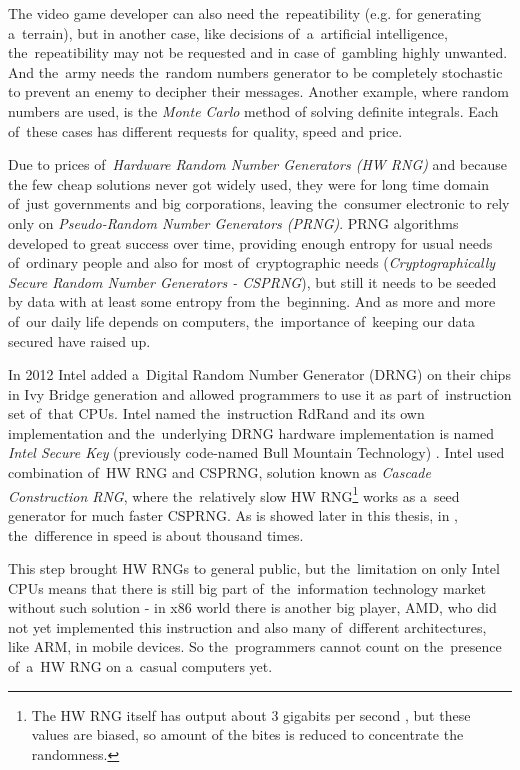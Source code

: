 \par{
The video game developer can also need the~repeatibility (e.g. for generating 
a~terrain), but in another case, like decisions of~a~artificial intelligence, 
the~repeatibility may not be requested and in case of~gambling highly unwanted. 
And the~army needs the~random numbers generator to be completely stochastic 
to prevent an enemy to decipher their messages. Another example, where random 
numbers are used, is the {\em Monte Carlo} method of solving definite integrals. 
Each of~these cases has different requests for quality, speed and price.
}

\par{
Due to prices of~{\em Hardware Random Number Generators (HW RNG)} 
and because the few cheap solutions never got widely used, 
they were for long time domain of~just governments and big corporations,
leaving the~consumer electronic to rely only on {\em Pseudo-Random Number 
Generators (PRNG)}. PRNG algorithms developed to great success over time, 
providing enough entropy for usual needs of~ordinary people and also for most 
of~cryptographic needs ({\em Cryptographically Secure Random Number 
Generators - CSPRNG}), but still it needs to be seeded by data with at least 
some entropy from the~beginning. And as more and more of~our daily life 
depends on computers, the~importance of~keeping our data secured have 
raised up. 
}

\par{
In 2012\cite{IntelRdRandFindAbout} Intel added a~Digital Random Number 
Generator (DRNG) on their chips in Ivy Bridge generation
and allowed programmers to use it as part 
of~instruction set of~that CPUs. Intel named the~instruction RdRand and its own 
implementation and the~underlying DRNG hardware implementation is named 
{\em Intel Secure Key} (previously code-named Bull Mountain Technology)
\cite{IntelDRNGAnalysis}. Intel used combination of~HW RNG and CSPRNG, 
solution known as {\em Cascade Construction RNG}, where the~relatively slow 
HW RNG\footnote{The HW RNG itself has output about 3 gigabits per second
\cite{BehindRdRand}, but these values are biased, so amount of the bites 
is reduced to concentrate the randomness.} works as a~seed generator 
for much faster CSPRNG. As is showed later in this thesis, 
in , the~difference in speed 
is about thousand times.
}

\par{
This step brought HW RNGs to general public, but the~limitation on only Intel 
CPUs means that there is still big part of~the~information technology market 
without such solution - in x86 world there is another big player, 
AMD, who did not yet implemented this instruction and also many 
of~different architectures, like ARM, in mobile devices. 
So the~programmers cannot count on the~presence of~a~HW RNG 
on a~casual computers yet. 
}

